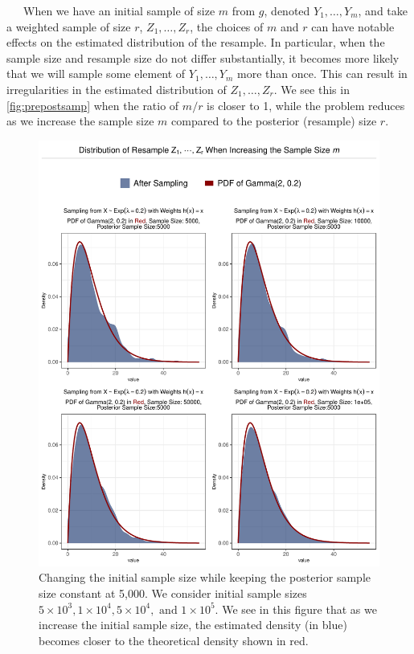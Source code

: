 \documentclass[12pt,twoside]{smiththesis}
\begin{document}
~~~When we have an initial sample of size \(m\) from \(g\), denoted \(Y_1,\dots,Y_m\), and take a weighted sample of size \(r\), \(Z_1,\dots,Z_r\), the choices of \(m\) and \(r\) can have notable effects on the estimated distribution of the resample. In particular, when the sample size and resample size do not differ substantially, it becomes more likely that we will sample some element of \(Y_1,\dots,Y_m\) more than once. This can result in irregularities in the estimated distribution of \(Z_1,\dots,Z_r\). We see this in \ref{fig:prepostsamp} when the ratio of \(m/r\) is closer to 1, while the problem reduces as we increase the sample size \(m\) compared to the posterior (resample) size \(r\).
\begin{figure}

{\centering \includegraphics[width=1\linewidth]{figure/resample-size} 

}

\caption{\label{fig:prepostsamp}Changing the initial sample size while keeping the posterior sample size constant at 5,000. We consider initial sample sizes $5 \times 10^3, 1 \times 10^4, 5 \times 10^4, \text{ and } 1\times 10^5$. We see in this figure that as we increase the initial sample size, the estimated density (in blue) becomes closer to the theoretical density shown in red.}\label{fig:pre-post-fig}
\end{figure}
\end{document}
